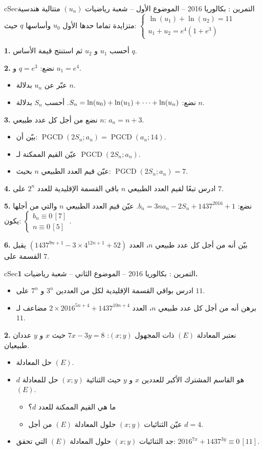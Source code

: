 \documentclass[12pt,a4paper]{article}
\newenvironment{BOX}[2]{\begin{otherlanguage}{english}\begin{arbox}{#1}{#2}}{\end{arbox}\end{otherlanguage}}
\newcounter{exo}
\newenvironment{tamrin}[1]{\stepcounter{exo}\begin{BOX}{cSec}{التمرين \theexo: #1}}{\end{BOX}}
\renewcommand{\cdots}{\mathinner{\cdotp\cdotp\cdotp}}
\newcommand{\pgcd}{\operatorname{PGCD}}
\newenvironment{sq}{\begin{itemize}[leftmargin=2.4em,itemsep=3pt]}{\end{itemize}}
\newcommand{\qa}{\item[(أ)]}\newcommand{\qb}{\item[(ب)]}\newcommand{\qc}{\item[(جـ)]}\newcommand{\qd}{\item[(د)]}\newcommand{\qe}{\item[(هـ)]}
\begin{document}
\begin{tamrin}{بكالوريا 2016 -- الموضوع الأول -- شعبة رياضيات}
$(u_n)$ متتالية هندسية متزايدة تماما حدها الأول $u_0$ وأساسها $q$ حيث:
$\begin{cases}\ln(u_1)+\ln(u_2)=11\\ u_1+u_2=e^4\left(1+e^3\right)\end{cases}$

\textbf{1.} أحسب $u_1$ و $u_2$ ثم استنتج قيمة الأساس $q$.

\textbf{2.} نضع: $q=e^3$ و $u_1=e^4$.
\begin{sq}
\qa عبّر عن $u_n$ بدلالة $n$.
\qb نضع: $S_n=\ln(u_0)+\ln(u_1)+\cdots+\ln(u_n)$. أحسب $S_n$ بدلالة $n$.
\end{sq}
\textbf{3.} نضع من أجل كل عدد طبيعي $n$: $a_n=n+3$.
\begin{sq}
\qa بيّن أن: $\pgcd(2S_n;a_n)=\pgcd(a_n;14)$.
\qb عيّن القيم الممكنة لـ $\pgcd(2S_n;a_n)$.
\qc عيّن قيم العدد الطبيعي $n$ بحيث: $\pgcd(2S_n;a_n)=7$.
\end{sq}
\textbf{4.} ادرس تبعًا لقيم العدد الطبيعي $n$ باقي القسمة الإقليدية للعدد $2^n$ على $7$.

\textbf{5.} نضع: $b_n=3na_n-2S_n+1437^{2016}+1$. عيّن قيم العدد الطبيعي $n$ والتي من أجلها يكون: $\begin{cases}b_n\equiv0\,[7]\\ n\equiv0\,[5]\end{cases}$.

\textbf{6.} بيّن أنه من أجل كل عدد طبيعي $n$، العدد $\left(1437^{9n+1}-3\times4^{12n+1}+52\right)$ يقبل القسمة على $7$.
\end{tamrin}

\begin{tamrin}{بكالوريا 2016 -- الموضوع الثاني -- شعبة رياضيات}
\textbf{1.}
\begin{sq}
\qa ادرس بواقي القسمة الإقليدية لكل من العددين $3^n$ و $7^n$ على $11$.
\qb برهن أنه من أجل كل عدد طبيعي $n$، العدد $2\times2016^{5n+4}+1437^{10n+4}$ مضاعف لـ $11$.
\end{sq}
\textbf{2.} نعتبر المعادلة $(E)$ ذات المجهول $(x;y)$: $7x-3y=8$ حيث $x$ و $y$ عددان طبيعيان.
\begin{sq}
\qa حل المعادلة $(E)$.
\qb $d$ هو القاسم المشترك الأكبر للعددين $x$ و $y$ حيث الثنائية $(x;y)$ حل للمعادلة $(E)$.
\begin{itemize}
\item ما هي القيم الممكنة للعدد $d$؟
\item عيّن الثنائيات $(x;y)$ حلول المعادلة $(E)$ من أجل $d=4$.
\end{itemize}
\qc جد الثنائيات $(x;y)$ حلول المعادلة $(E)$ التي تحقق: $2016^{7x}+1437^{3y}\equiv0\,[11]$.
\end{sq}
\end{tamrin}
\end{document}
